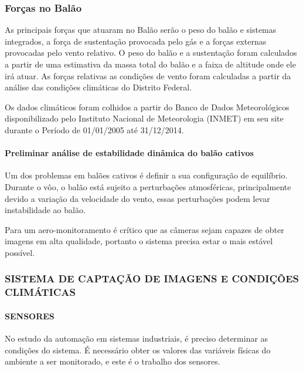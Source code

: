     \subsubsection{Forças no Balão}
    As principais forças que atuaram no Balão serão o peso do balão e sistemas integrados, a força de sustentação provocada pelo gás e a forças externas provocadas pelo vento relativo. O peso do balão e a sustentação foram calculados a partir de uma estimativa da massa total do balão e a faixa de altitude onde ele irá atuar. As forças relativas as condições de vento foram calculadas a partir da análise das condições climáticas do Distrito Federal.
    
    Os dados climáticos foram colhidos a partir do Banco de Dados Meteorológicos disponibilizado pelo Instituto Nacional de Meteorologia (INMET) em seu site durante o Período de 01/01/2005 até 31/12/2014.
    
    \paragraph{Preliminar análise de estabilidade dinâmica do balão cativos}
    Um dos problemas em balões cativos é definir a sua configuração de equilíbrio. Durante o vôo, o balão está sujeito a perturbações atmosféricas, principalmente devido a variação da velocidade do vento, essas perturbações podem levar instabilidade ao balão.
    
    Para um aero-monitoramento é crítico que as câmeras sejam capazes de obter imagens em alta qualidade, portanto o sistema precisa estar o mais estável possível.
    
  \subsubsection{SISTEMA DE CAPTAÇÃO DE IMAGENS  E CONDIÇÕES CLIMÁTICAS}
    \paragraph{SENSORES}
    No estudo da automação em sistemas industriais, é preciso determinar as condições do sistema. É necessário obter os valores das variáveis físicas do ambiente a ser monitorado, e este é o trabalho dos sensores.
    
